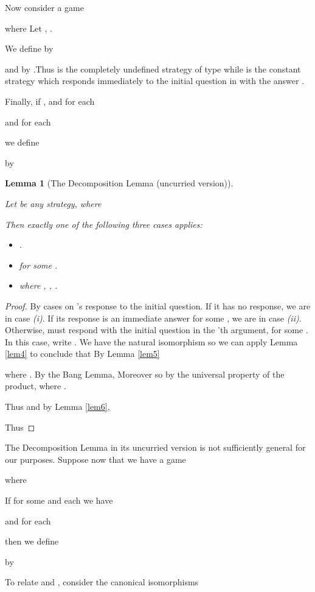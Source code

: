 \documentclass[11pt]{article}
\newtheorem{lemma}[theorem]{Lemma}
\begin{document}
Now consider a game

where 
Let , .

We define
 by

and 
by .Thus  is
the completely undefined strategy of type
 while  is the constant
strategy which responds immediately to the initial question in 
with the answer .

Finally, if , and for each 

and for each 

we define

by

\begin{lemma}[The Decomposition Lemma (uncurried version)]\label{lem7}

Let  be any strategy,
where

Then exactly one of the following three cases applies:
\begin{itemize}
\item[(i)] .
\item[(ii)]  for some .
\item[(iii)] 

where , ,  .
\end{itemize}
\end{lemma}

\begin{proof} By cases on 's response to the initial
question. If it has no response, we are in case {\it (i)}. If its
response is an immediate answer  for some , we are
in case {\it (ii)}. Otherwise,  must respond with the
initial question in the 'th argument, for some . In this case, write . We have the natural isomorphism
 so
we can apply Lemma \ref{lem4} to conclude that
 By Lemma \ref{lem5}

where . By the Bang
Lemma,  Moreover
 so by the universal property of the
product,  where .

Thus  and by Lemma \ref{lem6},

Thus

\end{proof}

The Decomposition Lemma in its uncurried version is not sufficiently
general for our purposes. Suppose now that we have a game

where


If for some  and each  we have

and for each 

then we define

by

To relate  and , consider the canonical isomorphisms
\end{document}

